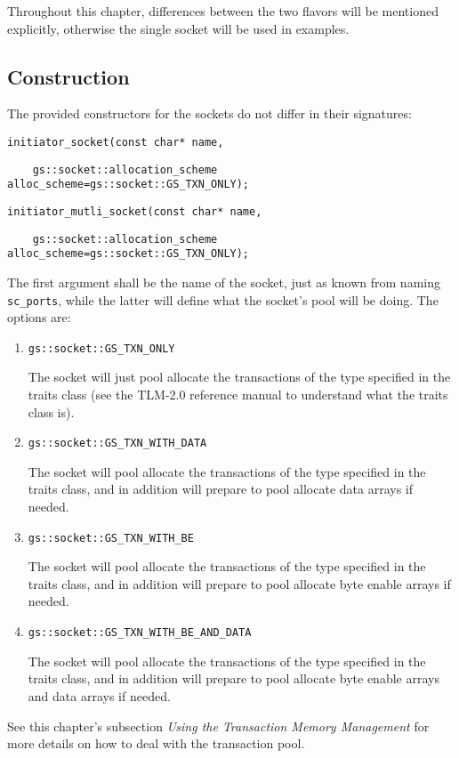 \documentclass[a4paper,10pt]{article}          %
\begin{document}
Throughout this chapter, differences between the two flavors will be mentioned explicitly, otherwise the single socket will be used in examples.

\subsection{Construction}
The provided constructors for the sockets do not differ in their signatures:

\verb|initiator_socket(const char* name, |

\verb|    gs::socket::allocation_scheme alloc_scheme=gs::socket::GS_TXN_ONLY);|

\verb|initiator_mutli_socket(const char* name, |

\verb|    gs::socket::allocation_scheme alloc_scheme=gs::socket::GS_TXN_ONLY);|

The first argument shall be the name of the socket, just as known from naming \verb|sc_ports|, while the latter will define what the socket's pool will be doing. The options are:
\begin{enumerate}
\item \verb|gs::socket::GS_TXN_ONLY|

The socket will just pool allocate the transactions of the type specified in the traits class (see the TLM-2.0 reference manual to understand what the traits class is).

\item \verb|gs::socket::GS_TXN_WITH_DATA|

The socket will pool allocate the transactions of the type specified in the traits class, and in addition will prepare to pool allocate data arrays if needed.

\item \verb|gs::socket::GS_TXN_WITH_BE|

The socket will pool allocate the transactions of the type specified in the traits class, and in addition will prepare to pool allocate byte enable arrays if needed.

\item \verb|gs::socket::GS_TXN_WITH_BE_AND_DATA|

The socket will pool allocate the transactions of the type specified in the traits class, and in addition will prepare to pool allocate byte enable arrays and data arrays if needed.

\end{enumerate}

See this chapter's subsection \emph{Using the Transaction Memory Management} for more details on how to deal with the transaction pool.
\end{document}
